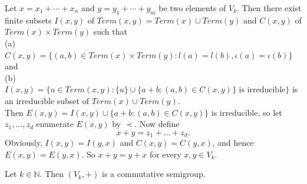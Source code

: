 \documentclass[twoside,11pt]{article}
\begin{document}
\begin{remark}{\label{3.44}}
	Let $x=x_1+\cdots+x_n$ and $y=y_1+\cdots+y_m$ be two elements of $V_k$. Then there exist finite subsets $I(x,y)$ of $Term(x,y)=Term(x)\cup Term(y)$ and $C(x,y)$ of $Term(x)\times Term(y)$ such that\\
	(a) $C(x,y)=\{(a,b)\in Term(x)\times Term(y):l(a)=l(b),\iota(a)=\iota(b)\}$ and \\
	(b) $I(x,y)=\{u\in Term(x,y): \{u\}\cup\{a+b:(a,b)\in C(x,y)\}\mbox{ is irreducible}\}$ is an irreducible subset of $Term(x)\cup Term(y)$. \\
	Then $E(x,y)=I(x,y)\cup \{a+b:(a,b)\in C(x,y)\}$ is irreducible, so let $z_1,\ldots,z_d$ enumerate $E(x,y)$ by $\prec$. Now define 
	\[
	x+y=z_1+\ldots+z_d.
	\]  
	Obviously, $I(x,y)=I(y,x)$ and $C(x,y)=C(y,x)$, and hence $E(x,y)=E(y,x)$. So $x+y=y+x$ for every $x,y\in V_k$.
\end{remark}
\begin{theorem}{\label{3.66}}
	Let $k\in\mathbb{N}$. Then $(V_k,+)$ is a commutative semigroup.
\end{theorem}
\end{document}
